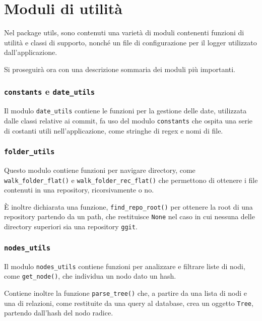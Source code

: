 \section{Moduli di utilità}
\label{sec:utils}
Nel package utils, sono contenuti una varietà di moduli contenenti funzioni di utilità e classi di supporto, nonché un file di configurazione per il logger utilizzato dall'applicazione.



Si proseguirà ora con una descrizione sommaria dei moduli più importanti.

\subsubsection{\texttt{constants} e \texttt{date\_utils}}

Il modulo \texttt{date\_utils} contiene le funzioni per la gestione delle date, utilizzata dalle classi relative ai commit, fa uso del modulo \texttt{constants} che ospita una serie di costanti utili nell'applicazione, come stringhe di regex e nomi di file.

\subsubsection{\texttt{folder\_utils}}

Questo modulo contiene funzioni per navigare directory, come \texttt{walk\_folder\_flat()} e \texttt{walk\_folder\_rec\_flat()} che permettono di ottenere i file contenuti in una repository, ricorsivamente o no.

È inoltre dichiarata una funzione, \texttt{find\_repo\_root()} per ottenere la root di una repository partendo da un path, che restituisce \texttt{None} nel caso in cui nessuna delle directory superiori sia una repository \texttt{ggit}.

\subsubsection{\texttt{nodes\_utils}}

Il modulo \texttt{nodes\_utils} contiene funzioni per analizzare e filtrare liste di nodi, come \texttt{get\_node()}, che individua un nodo dato un hash.

Contiene inoltre la funzione \texttt{parse\_tree()} che, a partire da una lista di nodi e una di relazioni, come restituite da una query al database, crea un oggetto \texttt{Tree}, partendo dall'hash del nodo radice.

